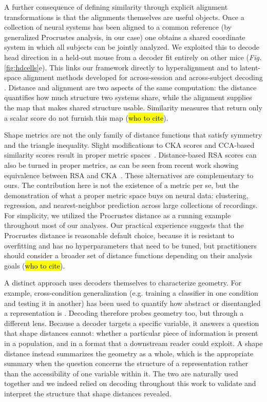 A further consequence of defining similarity through explicit alignment transformations is that the alignments themselves are useful objects.
Once a collection of neural systems has been aligned to a common reference (by generalized Procrustes analysis, in our case) one obtains a shared coordinate system in which all subjects can be jointly analyzed.
We exploited this to decode head direction in a held-out mouse from a decoder fit entirely on other mice (\textit{Fig.} \ref{fig:hdcells}e).
This links our framework directly to hyperalignment \parencite{haxby2020hyperalignment, Chen2021} and to latent-space alignment methods developed for across-session \parencite{degenhart2020stabilization, gallego2020long} and across-subject decoding \parencite{safaie2023preserved}. 
Distance and alignment are two aspects of the same computation: the distance quantifies how much structure two systems share, while the alignment supplies the map that makes shared structure usable.
Similarity measures that return only a scalar score do not furnish this map (\hl{who to cite}).

Shape metrics are not the only family of distance functions that satisfy symmetry and the triangle inequality.
Slight modifications to CKA scores and CCA-based similarity scores result in proper metric spaces~\parencite{Williams2021}.
Distance-based RSA scores can also be turned in proper metrics, as can be seen from recent work showing equivalence between RSA and CKA~\parencite{Williams2024}. These alternatives are complementary to ours. The contribution here is not the existence of a metric per se, but the demonstration of what a proper metric space buys on neural data: clustering, regression, and nearest-neighbor prediction across large collections of recordings.
 For simplicity, we utilized the Procrustes distance as a running example throughout most of our analyses.
Our practical experience suggests that the Procrustes distance is reasonable default choice, because it is resistant to overfitting and has no hyperparameters that need to be tuned, but practitioners should consider a broader set of distance functions depending on their analysis goals (\hl{who to cite}).

A distinct approach uses decoders themselves to characterize geometry. For example, cross-condition generalization (e.g. training a classifier in one condition and testing it in another) has been used to quantify how abstract or disentangled a representation is \parencite{bernardi,saez,barbosa2023,courellis2024, fascianelli2024neural,posani2026,nogueira2026}.
Decoding therefore probes geometry too, but through a different lens. Because a decoder targets a specific variable, it answers a question that shape distances cannot: whether a particular piece of information is present in a population, and in a format that a downstream reader could exploit.
A shape distance instead summarizes the geometry as a whole, which is the appropriate summary when the question concerns the structure of a representation rather than the accessibility of one variable within it.
The two are naturally used together and we indeed relied on decoding throughout this work to validate and interpret the structure that shape distances revealed.

